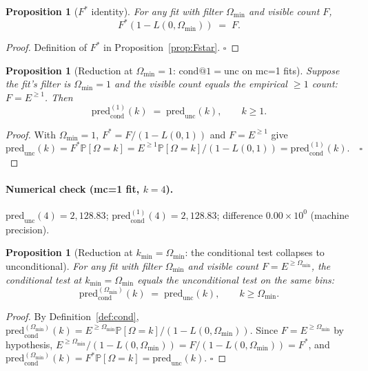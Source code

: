 \documentclass[11pt]{article}
\newcommand{\PROB}{\mathbb{P}}
\newcommand{\1}{\mathbf{1}}
\newcommand{\Om}{\Omega}
\newtheorem{proposition}[theorem]{Proposition}
\theoremstyle{definition}
\begin{document}
\begin{proposition}[$F^*$ identity]
For any fit with filter $\Om_{\min}$ and visible count $F$,
\begin{equation}
F^* (1 - L(0, \Om_{\min})) \;=\; F.
\label{eq:Fstar-identity}
\end{equation}
\end{proposition}
\begin{proof}
Definition of $F^*$ in Proposition~\ref{prop:Fstar}. $\square$
\end{proof}

\begin{proposition}[Reduction at $\Om_{\min}=1$: $\mathrm{cond}@1=\mathrm{unc}$
on mc=1 fits]\label{prop:reduce-mc1}
Suppose the fit's filter is $\Om_{\min} = 1$ and the visible count
equals the empirical $\ge 1$ count: $F = E^{\ge 1}$. Then
\begin{equation}
\mathrm{pred}_{\mathrm{cond}}^{(1)}(k)
\;=\;
\mathrm{pred}_{\mathrm{unc}}(k),
\qquad k\ge 1.
\label{eq:reduce-mc1}
\end{equation}
\end{proposition}
\begin{proof}
With $\Om_{\min} = 1$,
$F^* = F/(1 - L(0,1))$ and $F = E^{\ge 1}$ give
\begin{equation*}
\mathrm{pred}_{\mathrm{unc}}(k)
= F^*\PROB[\Om=k]
= E^{\ge 1}\PROB[\Om=k] / (1 - L(0,1))
= \mathrm{pred}_{\mathrm{cond}}^{(1)}(k).
\quad\square
\end{equation*}
\end{proof}

\paragraph{Numerical check (mc=1 fit, $k=4$).}
$\mathrm{pred}_{\mathrm{unc}}(4) = 2{,}128.83$;
$\mathrm{pred}_{\mathrm{cond}}^{(1)}(4) = 2{,}128.83$;
difference $0.00\times 10^0$ (machine precision).

\begin{proposition}[Reduction at $k_{\min}=\Om_{\min}$:
the conditional test collapses to unconditional]\label{prop:reduce-omin}
For any fit with filter $\Om_{\min}$ and visible count $F = E^{\ge\Om_{\min}}$,
the conditional test at $k_{\min} = \Om_{\min}$ equals the
unconditional test on the same bins:
\begin{equation}
\mathrm{pred}_{\mathrm{cond}}^{(\Om_{\min})}(k)
\;=\;
\mathrm{pred}_{\mathrm{unc}}(k),
\qquad k\ge \Om_{\min}.
\label{eq:reduce-omin}
\end{equation}
\end{proposition}
\begin{proof}
By Definition~\ref{def:cond},
$\mathrm{pred}_{\mathrm{cond}}^{(\Om_{\min})}(k) = E^{\ge\Om_{\min}}\PROB[\Om=k]/(1-L(0,\Om_{\min}))$.
Since $F = E^{\ge\Om_{\min}}$ by hypothesis,
$E^{\ge\Om_{\min}}/(1-L(0,\Om_{\min})) = F/(1-L(0,\Om_{\min})) = F^*$,
and
$\mathrm{pred}_{\mathrm{cond}}^{(\Om_{\min})}(k) = F^*\PROB[\Om=k] = \mathrm{pred}_{\mathrm{unc}}(k)$.
$\square$
\end{proof}
\end{document}
